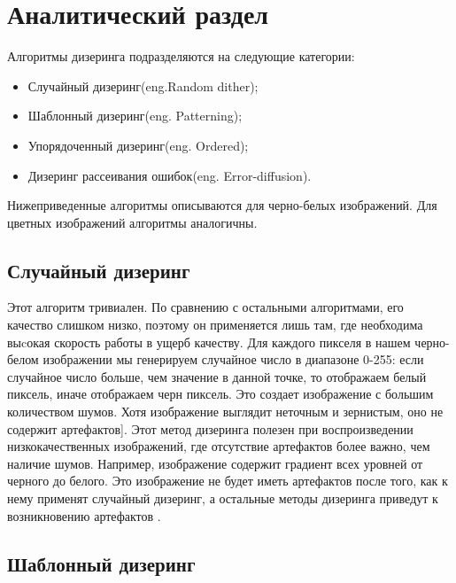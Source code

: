 \chapter{Аналитический раздел}
\label{cha:analysis}
%
%
Алгоритмы дизеринга подразделяются на следующие категории:

\begin{itemize}
\item Случайный  дизеринг(eng.Random dither);
\item Шаблонный дизеринг(eng. Patterning);
\item Упорядоченный дизеринг(eng. Ordered);
\item Дизеринг рассеивания ошибок(eng. Error-diffusion).
\end{itemize}

Нижеприведенные алгоритмы описываются для черно-белых изображений. Для цветных изображений алгоритмы аналогичны.




\section{Случайный дизеринг}
Этот алгоритм тривиален.  По сравнению с остальными алгоритмами, его качество слишком низко, поэтому он применяется лишь там, где необходима  выcокая скорость работы в ущерб качеству.\cite{Dh} 
Для каждого пикселя в нашем черно-белом изображении мы генерируем случайное число в диапазоне 0-255: если случайное число больше, чем значение в данной точке, то отображаем белый пиксель, иначе отображаем черн пиксель.
Это создает изображение с большим количеством шумов. Хотя изображение выглядит неточным и зернистым, оно не содержит артефактов\cite{Dh}]. Этот метод дизеринга полезен при воспроизведении низкокачественных изображений, где отсутствие артефактов более важно, чем наличие шумов. Например, изображение содержит градиент всех уровней от черного до белого. Это изображение не будет иметь артефактов после того, как к нему применят случайный дизеринг, а остальные методы дизеринга приведут к возникновению артефактов \cite{Dh}. 

\section{Шаблонный дизеринг}

